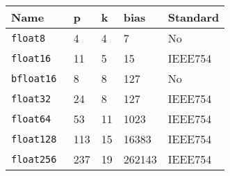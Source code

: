 \vspace*{.5em}
\begin{tabular}{|p{2cm}||p{1cm}|p{1cm}|p{1.5cm}|p{2cm}|}
    \hline
    Name           & p   & k  & bias    & Standard  \\
    \hline\hline 
    {\tt float8 }   & 4   & 4  & 7      & No       \\
    {\tt float16 }  & 11  & 5  & 15     & IEEE754  \\
    {\tt bfloat16 } & 8   & 8  & 127    & No       \\
    {\tt float32 }  & 24  & 8  & 127    & IEEE754  \\
    {\tt float64 }  & 53  & 11 & 1023   & IEEE754  \\
    {\tt float128}  & 113 & 15 & 16383  & IEEE754  \\
    {\tt float256}  & 237 & 19 & 262143 & IEEE754  \\
    \hline
\end{tabular}
